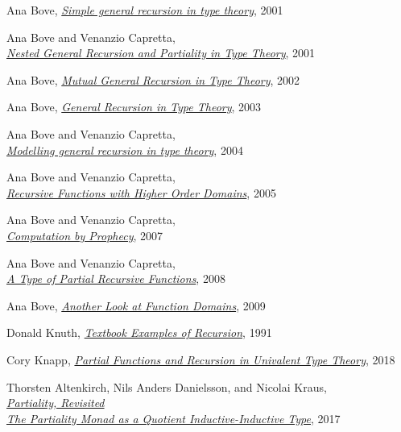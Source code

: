 \documentclass[declaration,mgr,english,shortabstract]{iithesis}
\begin{document}
\begin{thebibliography}{1}
    Ana Bove,
    \href{https://dl.acm.org/doi/10.5555/774194.774197}{\textit{Simple general recursion in type theory}},
    2001

    Ana Bove and Venanzio Capretta, \\
    \href{https://www.researchgate.net/publication/285777618_Nested_General_Recursion_and_Partiality_in_Type_Theory}{\textit{Nested General Recursion and Partiality in Type Theory}},
    2001

    Ana Bove,
    \href{https://core.ac.uk/display/197949303}{\textit{Mutual General Recursion in Type Theory}},
    2002

    Ana Bove,
    \href{https://link.springer.com/chapter/10.1007/3-540-39185-1_3}{\textit{General Recursion in Type Theory}},
    2003

    Ana Bove and Venanzio Capretta, \\
    \href{http://www.cs.nott.ac.uk/~pszvc/publications/General_Recursion_MSCS_2005.pdf}{\textit{Modelling general recursion in type theory}},
    2004

    Ana Bove and Venanzio Capretta, \\
    \href{http://www.cs.ru.nl/~venanzio/publications/Higher_Domains_TLCA2005.pdf}{\textit{Recursive Functions with Higher Order Domains}},
    2005

    Ana Bove and Venanzio Capretta, \\
    \href{https://www.researchgate.net/publication/220727479_Computation_by_Prophecy}{\textit{Computation by Prophecy}},
    2007

    Ana Bove and Venanzio Capretta, \\
    \href{https://www.researchgate.net/publication/221302295_A_Type_of_Partial_Recursive_Functions}{\textit{A Type of Partial Recursive Functions}},
    2008

    Ana Bove,
    \href{https://core.ac.uk/download/pdf/82578788.pdf}{\textit{Another Look at Function Domains}},
    2009

    Donald Knuth,
    \href{https://arxiv.org/pdf/cs/9301113.pdf}{\textit{Textbook Examples of Recursion}},
    1991

    Cory Knapp,
    \href{https://etheses.bham.ac.uk//id/eprint/8448/4/Knapp18PhD.pdf}{\textit{Partial Functions and Recursion in Univalent Type Theory}},
    2018

    Thorsten Altenkirch, Nils Anders Danielsson, and Nicolai Kraus, \\
    \href{https://arxiv.org/pdf/1610.09254.pdf}{\textit{Partiality, Revisited \\The Partiality Monad as a Quotient Inductive-Inductive Type}},
    2017


\end{thebibliography}
\end{document}
